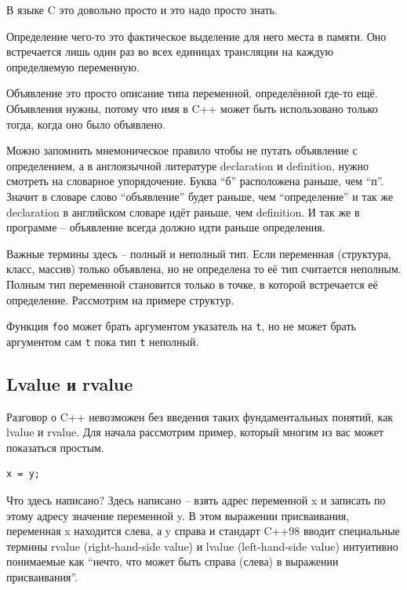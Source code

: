 \documentclass[a4paper,12pt,oneside]{article}
\begin{document}
В языке C это довольно просто и это надо просто знать.

Определение чего-то это фактическое выделение для него места в памяти. Оно встречается лишь один раз во всех единицах трансляции на каждую определяемую переменную.

Объявление это просто описание типа переменной, определённой где-то ещё. Объявления нужны, потому что имя в C++ может быть использовано только тогда, когда оно было объявлено.

Можно запомнить мнемоническое правило чтобы не путать объявление с определением, а в англоязычной литературе declaration и definition, нужно смотреть на словарное упорядочение.  Буква ``б'' расположена раньше, чем ``п''. Значит в словаре слово ``объявление'' будет раньше, чем ``определение'' и так же declaration в английском словаре идёт раньше, чем definition. И так же в программе – объявление всегда должно идти раньше определения.

Важные термины здесь – полный и неполный тип. Если переменная (структура, класс, массив) только объявлена, но не определена то её тип считается неполным. Полным тип переменной становится только в точке, в которой встречается её определение. Рассмотрим на примере структур.



Функция \lstinline!foo! может брать аргументом указатель на \lstinline!t!, но не может брать аргументом сам \lstinline!t! пока тип \lstinline!t! неполный.

\subsection{Lvalue и rvalue}

Разговор о C++ невозможен без введения таких фундаментальных понятий, как lvalue и rvalue. Для начала рассмотрим пример, который многим из вас может показаться простым.

\begin{lstlisting}
x = y;
\end{lstlisting}

Что здесь написано? Здесь написано – взять адрес переменной x и записать по этому адресу значение переменной y. В этом выражении присваивания, переменная x находится слева, а y справа и стандарт C++98 вводит специальные термины rvalue (right-hand-side value) и lvalue (left-hand-side value) интуитивно понимаемые как ``нечто, что может быть справа (слева) в выражении присваивания''. 
\end{document}
